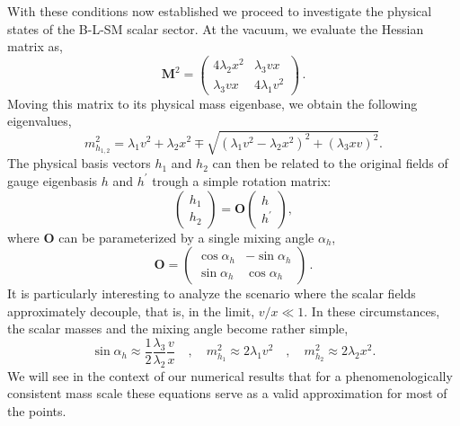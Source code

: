 \documentclass[10pt]{book}
\renewcommand{\(}{\left(}
\renewcommand{\)}{\right)}
\renewcommand{\[}{\left[}
\renewcommand{\]}{\right]}
\begin{document}
With these conditions now established we proceed to investigate the physical states of the B-L-SM scalar sector. 
%
At the vacuum, we evaluate the Hessian matrix as,
%
\begin{equation}
\mathbf{M}^2 =
\begin{pmatrix}
4 \lambda_2 x^2 & \lambda_3 v x \\ 
\lambda_3 v x   & 4 \lambda_1 v^2 
\end{pmatrix}\,.
\label{eq:hess}
\end{equation}
% 
Moving this matrix to its physical mass eigenbase, we obtain the following eigenvalues,
%
\begin{equation}
m_{h_{1,2}}^2 = \lambda_1 v^2 + \lambda_2 x^2 \mp \sqrt{(\lambda_1 v^2 - \lambda_2 x^2)^2 + (\lambda_3 x v)^2}.
\label{eq:eigvals}
\end{equation}
The physical basis vectors $h_1$ and $h_2$ can then be related to the original fields of gauge eigenbasis $h$ and $h^\prime$ trough a simple rotation matrix:
%
\begin{equation}
	\begin{pmatrix}
	h_1 \\
	h_2 
	\end{pmatrix}
	=
	\mathbf{O}
	\begin{pmatrix}
	h \\
	h^\prime 
	\end{pmatrix},
	\label{eq:trans}
\end{equation}
%
where $\mathbf{O}$ can be parameterized by a single mixing angle $\alpha_h$,
%
\begin{equation}
	\mathbf{O} = 
	\begin{pmatrix}
	\cos \alpha_h & -\sin \alpha_h \\
	\sin \alpha_h & \cos \alpha_h 
	\end{pmatrix}\,.
	\label{eq:rotmat}
\end{equation}
%
%
It is particularly interesting to analyze the scenario where the scalar fields approximately decouple, that is, in the limit, $v/x\ll 1$. In these circumstances, the scalar masses and the mixing angle become rather simple,
\begin{equation}
\sin \alpha_h \approx \dfrac{1}{2}\dfrac{\lambda_3}{\lambda_2} \dfrac{v}{x} \quad , \quad 
m_{h_1}^2 \approx 2 \lambda_1 v^2 \quad , \quad m_{h_2}^2 \approx 2 \lambda_2 x^2
\label{eq:simplify} .
\end{equation}
%
We will see in the context of our numerical results that for a phenomenologically consistent mass scale these equations serve as a valid approximation for most of the points. 
\end{document}

